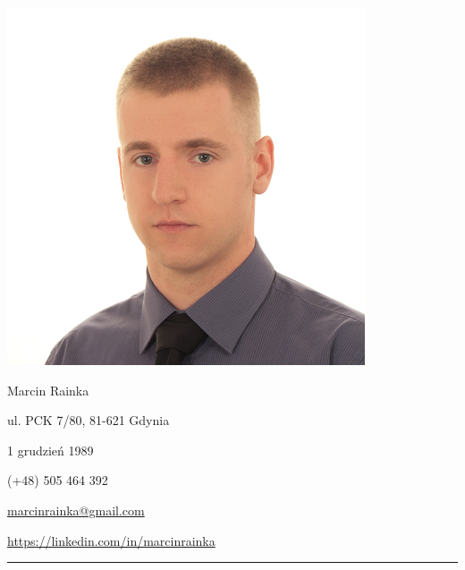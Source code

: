 \documentclass[11pt,a4paper]{article}
\begin{document}
    \pagestyle{empty}
  
    \begin{center}
        \begin{minipage}[b]{3cm}
            \includegraphics[scale=0.28, right]{photo.png}
        \end{minipage}
        \hspace{0.2cm}
        \begin{minipage}[b]{7cm}
            {\Large \sc Marcin Rainka}
            \begin{description} \itemsep1pt \parskip0pt 
                \item[Adres] ul. PCK 7/80, 81-621 Gdynia
                \item[Data urodzenia] 1 grudzień 1989
                \item[Telefon] (+48) 505 464 392
                \item[E-mail] \href{mailto:marcinrainka@gmail.com}{marcinrainka@gmail.com}
                \item[LinkedIn] \href{https://linkedin.com/in/marcinrainka}{https://linkedin.com/in/marcinrainka}
            \end{description}
        \end{minipage}
    \end{center}

    \vspace{-0.4cm}

    \noindent\rule{\textwidth}{0.1mm}
  
  
\end{document}
